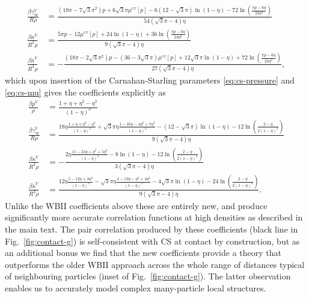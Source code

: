 \documentclass[12pt]{report}
\begin{document}
\begin{subequations}
  \begin{align}
    \frac{\beta \gamma_\infty^{V}}{R\rho} &=
    \frac{ (18\pi - 7\sqrt{3} \pi^2) p + 6\sqrt{3}\pi \mu^{ex}[p]
      - 6(12 - \sqrt{3}\pi) \ln{(1-\eta)}
      - 72\ln{\left( \frac{\pi p - 6\eta}{24\eta^2} \right)} }
    {54(\sqrt{3}\pi - 4) \eta}
    \label{eq:virial-gamma}
    \\
    \frac{\beta \kappa^{V}}{R^2\rho} &=
    \frac{ 5\pi p - 12 \mu^{ex}[p] + 24 \ln{(1-\eta)}
      + 36\ln{\left( \frac{\pi p - 6\eta}{24\eta^2} \right)} }
    {9(\sqrt{3}\pi - 4) \eta}
    \\
    \frac{\beta \overline{\kappa}^{V}}{R^3\rho} &=
    - \frac{
      (18\pi - 2\sqrt{3} \pi^2) p - (36 - 3\sqrt{3}\pi) \mu^{ex}[p] + 12\sqrt{3}\pi \ln{(1-\eta)}
      + 72\ln{\left( \frac{\pi p - 6\eta}{24\eta^2} \right)} }
    {27(\sqrt{3}\pi - 4) \eta},
  \end{align}
\end{subequations}
which upon insertion of the Carnahan-Starling parameters \eqref{eq:cs-pressure} and \eqref{eq:cs-mu} gives the coefficients explicitly as
\begin{subequations}
  \begin{align}
    \frac{\beta p^{V}}{\rho} &=
    \frac{1 + \eta + \eta^2 - \eta^3}{(1-\eta)^3} \\
    \frac{\beta \gamma_\infty^{V}}{R\rho} &=
    \frac{ 18\eta \frac{1 + \eta + \eta^2 - \eta^3}{(1-\eta)^3}
      + \sqrt{3}\pi\eta \frac{1 - 16\eta - 4\eta^2 + 7\eta^3}{(1-\eta)^3}
      - (12 - \sqrt{3}\pi) \ln{(1-\eta)}
      - 12\ln{\left( \frac{2 - \eta}{2(1-\eta)^3} \right)} }
    {9(\sqrt{3}\pi - 4) \eta} \\
    \frac{\beta \kappa^{V}}{R^2\rho} &= -
    \frac{ 2\eta \frac{11 - 23\eta + \eta^2 + 5\eta^3}{(1-\eta)^3}
      - 8 \ln{(1-\eta)}
      - 12\ln{\left( \frac{2 - \eta}{2(1-\eta)^3} \right)} }
    {3(\sqrt{3}\pi - 4) \eta} \\
    \frac{\beta \overline{\kappa}^{V}}{R^3\rho} &=
    \frac{ 12\eta \frac{5 - 12\eta + 3\eta^3}{(1-\eta)^3}
      - \sqrt{3}\pi\eta \frac{4 - 13\eta - \eta^2 + 4\eta^3}{(1-\eta)^3}
      - 4\sqrt{3}\pi \ln{(1-\eta)}
      - 24\ln{\left( \frac{2 - \eta}{2(1-\eta)^3} \right)} }
    {9(\sqrt{3}\pi - 4) \eta}.
  \end{align}
\end{subequations}
Unlike the WBII coefficients above these are entirely new, and produce significantly more accurate correlation functions at high densities as described in the main text.
The pair correlation produced by these coefficients (black line in Fig.\ \ref{fig:contact-g}) is self-consistent with CS at contact by construction, but as an additional bonus we find that the new coefficients provide a theory that outperforms the older WBII approach across the whole range of distances typical of neighbouring particles (inset of Fig.\ \ref{fig:contact-g}).
The latter observation enables us to accurately model complex many-particle local structures.
\end{document}
